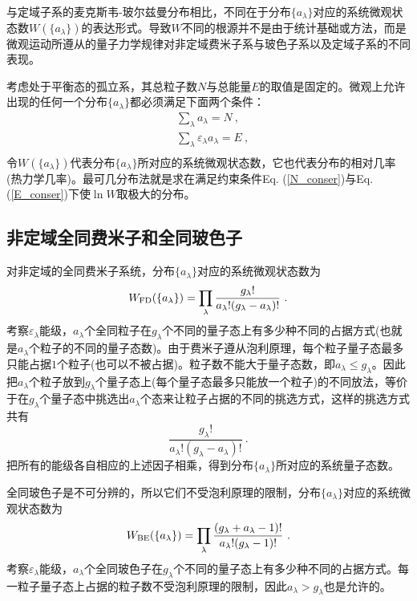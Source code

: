 \documentclass[12pt,a4paper]{article}
\begin{document}
与定域子系的麦克斯韦-玻尔兹曼分布相比，不同在于分布$\{a_\lambda \}$对应的系统微观状态数$W(\{a_\lambda \})$的表达形式。导致$W$不同的根源并不是由于统计基础或方法，而是微观运动所遵从的量子力学规律对非定域费米子系与玻色子系以及定域子系的不同表现。

考虑处于平衡态的孤立系，其总粒子数$N$与总能量$E$的取值是固定的。微观上允许出现的任何一个分布$\{a_\lambda \}$都必须满足下面两个条件：
\begin{align}
\label{N_conser}
& \sum_\lambda a_\lambda = N ~, \\
\label{E_conser}
& \sum_\lambda \varepsilon_\lambda a_\lambda = E ~, \\
\end{align}
令$W(\{a_\lambda \})$代表分布$\{a_\lambda \}$所对应的系统微观状态数，它也代表分布的相对几率(热力学几率)。最可几分布法就是求在满足约束条件Eq. (\ref{N_conser})与Eq. (\ref{E_conser})下使$\ln W$取极大的分布。

\subsection{非定域全同费米子和全同玻色子}
对非定域的全同费米子系统，分布$\{a_\lambda \}$对应的系统微观状态数为
\begin{equation}
W_{\rm FD}(\{a_\lambda \}) = \prod_\lambda \dfrac{g_\lambda !}{a_\lambda ! (g_\lambda -a_\lambda) !} ~.
\end{equation}
考察$ \varepsilon_\lambda$能级，$a_\lambda$个全同粒子在$g_\lambda$个不同的量子态上有多少种不同的占据方式(也就是$a_\lambda$个粒子的不同的量子态数)。由于费米子遵从泡利原理，每个粒子量子态最多只能占据$1$个粒子(也可以不被占据)。粒子数不能大于量子态数，即$a_\lambda \leqslant g_\lambda$。因此把$a_\lambda$个粒子放到$g_\lambda$个量子态上(每个量子态最多只能放一个粒子)的不同放法，等价于在$g_\lambda$个量子态中挑选出$a_\lambda$个态来让粒子占据的不同的挑选方式，这样的挑选方式共有
\begin{equation*}
\dfrac{g_\lambda !}{a_\lambda ! (g_\lambda -a_\lambda) !} ~.
\end{equation*}
把所有的能级各自相应的上述因子相乘，得到分布$\{ a_\lambda \}$所对应的系统量子态数。

全同玻色子是不可分辨的，所以它们不受泡利原理的限制，分布$\{a_\lambda \}$对应的系统微观状态数为
\begin{equation}
W_{\rm BE}(\{a_\lambda \}) = \prod_\lambda \dfrac{(g_\lambda +a_\lambda -1) !}{a_\lambda ! (g_\lambda -1) !} ~.
\end{equation}
考察$ \varepsilon_\lambda$能级，$a_\lambda$个全同玻色子在$g_\lambda$个不同的量子态上有多少种不同的占据方式。每一粒子量子态上占据的粒子数不受泡利原理的限制，因此$a_\lambda > g_\lambda$也是允许的。
\end{document}
